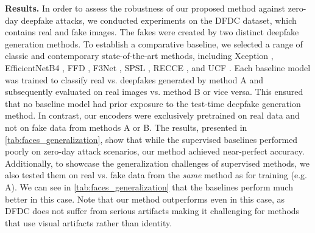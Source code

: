 \documentclass{article} \usepackage{iclr2024_conference,times}
\begin{document}
\textbf{Results.}
In order to assess the robustness of our proposed method against zero-day deepfake attacks, we conducted experiments on the DFDC dataset, which contains real and fake images. The fakes were created by two distinct deepfake generation methods. To establish a comparative baseline, we selected a range of classic and contemporary state-of-the-art methods, including Xception \citep{learning3_ff++}, EfficientNetB4 \citep{efficientnet}, FFD \citep{face_forgery1_ffd}, F3Net \citep{high_freq_eccv_2020_f3net}, SPSL \citep{spsl_high_freq}, RECCE \citep{generalization1_recce}, and UCF \citep{ucf}. Each baseline model was trained to classify real vs. deepfakes generated by method A and subsequently evaluated on real images vs. method B or vice versa. This ensured that no baseline model had prior exposure to the test-time deepfake generation method. In contrast, our encoders were exclusively pretrained on real data and not on fake data from methods A or B. The results, presented in \cref{tab:faces_generalization}, show that while the supervised baselines performed poorly on zero-day attack scenarios, our method achieved near-perfect accuracy. Additionally, to showcase the generalization challenges of supervised methods, we also tested them on real vs. fake data from the \textit{same} method as for training (e.g. A). We can see in \cref{tab:faces_generalization} that the baselines perform much better in this case. Note that our method outperforms even in this case, as DFDC does not suffer from serious artifacts making it challenging for methods that use visual artifacts rather than identity.
\end{document}
